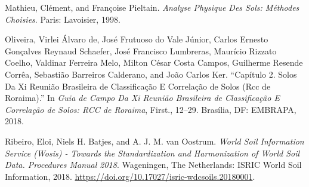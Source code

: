 \documentclass[a4paper,dvipsnames]{tufte-book}
\begin{document}
\hypertarget{ref-MathieuEtAl1998}{}
Mathieu, Clément, and Françoise Pieltain. \emph{Analyse Physique Des
Sols: Méthodes Choisies}. Paris: Lavoisier, 1998.

\hypertarget{ref-OliveiraEtAl2018b}{}
Oliveira, Virlei Álvaro de, José Frutuoso do Vale Júnior, Carlos Ernesto
Gonçalves Reynaud Schaefer, José Francisco Lumbreras, Maurício Rizzato
Coelho, Valdinar Ferreira Melo, Milton César Costa Campos, Guilherme
Resende Corrêa, Sebastião Barreiros Calderano, and João Carlos Ker.
``Capítulo 2. Solos Da Xi Reunião Brasileira de Classificação E
Correlação de Solos (Rcc de Roraima).'' In \emph{Guia de Campo Da Xi
Reunião Brasileira de Classificação E Correlação de Solos: RCC de
Roraima}, First., 12--29. Brasília, DF: EMBRAPA, 2018.

\hypertarget{ref-RibeiroEtAl2018}{}
Ribeiro, Eloi, Niels H. Batjes, and A. J. M. van Oostrum. \emph{World
Soil Information Service (Wosis) - Towards the Standardization and
Harmonization of World Soil Data. Procedures Manual 2018}. Wageningen,
The Netherlands: ISRIC World Soil Information, 2018.
\url{https://doi.org/10.17027/isric-wdcsoils.20180001}.
\end{document}
